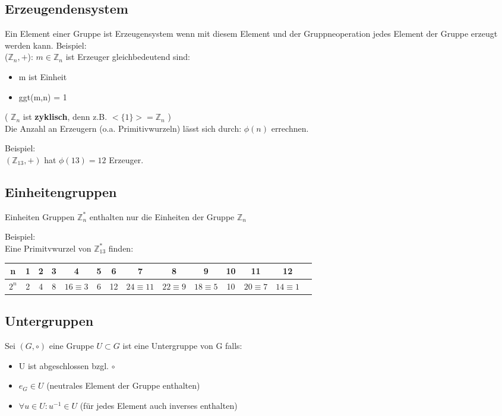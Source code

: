 \documentclass[12pt, letterpaper, twoside]{article}
\begin{document}
\subsection{Erzeugendensystem}
Ein Element einer Gruppe ist Erzeugensystem wenn mit diesem Element und der Gruppneoperation jedes Element der Gruppe erzeugt werden kann.
Beispiel: \\
($\mathbb{Z}_n , + $): $ m \in \mathbb{Z}_n $ ist Erzeuger gleichbedeutend sind:
\begin{itemize}
	\item m ist Einheit
	\item ggt(m,n) = 1
\end{itemize}

\noindent
( $ \mathbb{Z}_n $ ist \textbf{zyklisch}, denn z.B. $ <\{1\}>  =  \mathbb{Z}_n $ ) \\

\noindent
Die Anzahl an Erzeugern (o.a. Primitivwurzeln) lässt sich durch: $ \phi (n) $ errechnen.

Beispiel: \\
\indent
$ ( \mathbb{Z}_{13}, +)$ hat $ \phi(13) = 12 $ Erzeuger.



\subsection{Einheitengruppen}
Einheiten Gruppen $\mathbb{Z}_{n}^* $ enthalten nur die Einheiten der Gruppe $ \mathbb{Z}_n $

Beispiel: \\
Eine Primitvwurzel von $ \mathbb{Z}_{13}^* $ finden: \\
\begin{tabular}{c | c c c c c c c c c c c c c}
n & 1 & 2 & 3 & 4 & 5 & 6 & 7 & 8 & 9 & 10 & 11 & 12 \\
\hline
$ 2^n $& 2 & 4 & 8 & $ 16 \equiv 3 $ & 6 & 12 & $ 24 \equiv 11 $& $ 22 \equiv 9$ & $18 \equiv 5$ & 10 & $20 \equiv 7$ & $14 \equiv 1$ \\
\end{tabular}

\subsection{Untergruppen}
Sei $(G, \circ)$ eine Gruppe
$U \subset G$ ist eine Untergruppe von G falls:

\begin{itemize}
	\item U ist abgeschlossen bzgl.  $ \circ $
	\item $ e_G \in U $ (neutrales Element der Gruppe enthalten)
	\item $ \forall u \in U: u^{-1} \in U $ (für jedes Element auch inverses enthalten)
\end{itemize}
\end{document}
